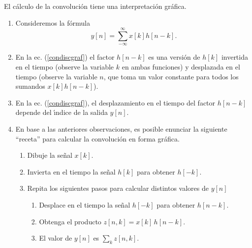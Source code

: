 El c\'{a}lculo de la convoluci\'{o}n tiene una interpretaci\'{o}n gr\'{a}fica.
\begin{enumerate}
\item Consideremos la f\'{o}rmula
  \begin{equation}
    y\left[ n\right] = \sum_{-\infty }^{\infty }x\left[ k\right] h\left[ n-k\right].
    \label{condiscgraf}
  \end{equation}
        
\item En la ec. (\ref{condiscgraf}) el factor $h[n-k]$ es una
  versi\'{o}n de $h[k]$ invertida en el tiempo (observe la variable
  $k$ en ambas funciones) y desplazada en el tiempo (observe la
  variable $n$, que toma un valor constante para todos los sumandos
  $x\left[ k\right] h\left[ n-k\right]$).
        
\item En la ec. (\ref{condiscgraf}), el desplazamiento en el tiempo
  del factor $h[n-k]$ depende del \'{\i}ndice de la salida $y[n]$.
        
\item En base a las anteriores observaciones, es posible enunciar la
  siguiente ``receta'' para calcular la convoluci\'{o}n en forma
  gr\'{a}fica.
  \begin{enumerate}
  \item Dibuje la se\~{n}al $x[k]$.
                
  \item Invierta en el tiempo la se\~{n}al $h[k]$ para obtener
    $h[-k]$.
                
  \item Repita los siguientes pasos para calcular distintos valores de
    $y[n]$
    \begin{enumerate}
                
    \item Desplace en el tiempo la se\~{n}al $h[-k]$ para obtener
      $h[n-k]$.
                        
    \item Obtenga el producto $z[n,k] = x[k] \, h[n-k]$.
                        
    \item El valor de $y[n]$ es $\sum_{k} z[n,k]$.
                        
    \end{enumerate}
  \end{enumerate}
\end{enumerate}

